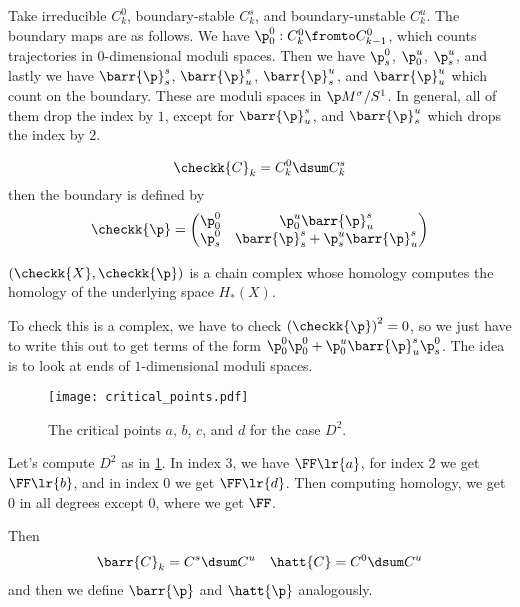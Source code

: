 \documentclass{amsart}
\begin{document}
Take irreducible $C^0_k$, boundary-stable $C_k^s$, 
and boundary-unstable $C_k^u$.
The boundary maps are as follows.
We have
$\p^0_0: C^0_k\fromto C^0_{k-1}$,
which counts trajectories in $0$-dimensional moduli spaces.
Then we have $\p_s^0$, $\p_0^u$, $\p_s^u$,
and lastly we have
$\barr{\p}_s^s$, $\barr{\p}_u^s$, $\barr{\p}_s^u$, and $\barr{\p}_u^u$ which count on the boundary.
These are moduli spaces in $\p M^\sigma / S^1$.
In general, all of them drop the index by $1$, except for $\barr{\p}_u^s$, 
and $\barr{\p}_s^u$ which drops the index by $2$.

\begin{equation}
\checkk{C}_k = C_k^0 \dsum C_k^s
\end{equation}
then the boundary is defined by
\begin{equation}
\checkk{\p} =
\begin{pmatrix}
\p_0^0&\p^u_0 \barr{\p}_u^s \\
\p^0_s&\barr{\p}_s^s + \p_s^u \barr{\p}_u^s
\end{pmatrix}
\end{equation}

\begin{fact}
$\left( \checkk{X} , \checkk{\p} \right)$ is a chain complex whose homology computes
the homology of the underlying space $H_*\left( X \right)$. 
\end{fact}

To check this is a complex, we have to check $\left( \checkk{\p} \right)^2 = 0$, 
so we just have to write this out to get terms of the form
$\p^0_0 \p_0^0 + \p_0^u \barr{\p}_u^s \p_s^0$.
The idea is to look at ends of $1$-dimensional moduli spaces.

\begin{figure}
\texttt{[image: critical\_points.pdf]}
\caption{The critical points $a$, $b$, $c$, and $d$ for the case $D^2$.}
\label{fig:critical_points}
\end{figure}

Let's compute $D^2$ as in \cref{fig:critical_points}.
In index $3$, we have $\FF\lr{a}$, for index $2$ we get $\FF\lr{b}$, and
in index $0$ we get $\FF\lr{d}$.
Then computing homology, we get $0$ in all degrees except $0$, where we get $\FF$.

Then
\begin{align}
\barr{C}_k = C^s \dsum C^u
&&
\hatt{C} = C^0 \dsum C^u
\end{align}
and then we define $\barr{\p}$ and $\hatt{\p}$ analogously.
\end{document}

